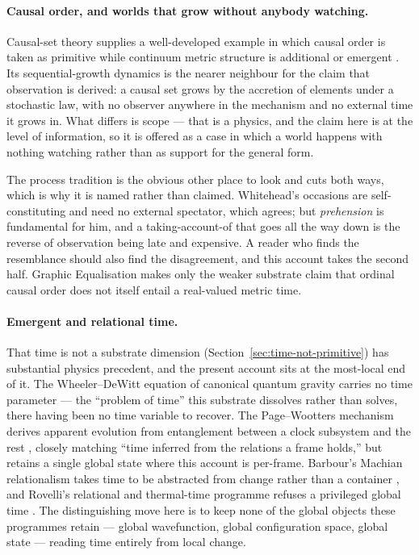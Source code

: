 \documentclass[11pt,a4paper]{article}
\theoremstyle{remark}\newtheorem{remark}[definition]{Remark}
\begin{document}
\paragraph{Causal order, and worlds that grow without anybody watching.} Causal-set theory supplies a
well-developed example in which causal order is taken as primitive while continuum metric structure is
additional or emergent \citep{bombelli1987}. Its sequential-growth dynamics \citep{rideout1999} is the
nearer neighbour for the claim that observation is derived: a causal set grows by the accretion of
elements under a stochastic law, with no observer anywhere in the mechanism and no external time it
grows in. What differs is scope --- that is a physics, and the claim here is at the level of
information, so it is offered as a case in which a world happens with nothing watching rather than as
support for the general form.

The process tradition is the obvious other place to look and cuts both ways, which is why it is named
rather than claimed. Whitehead's occasions are self-constituting and need no external spectator, which
agrees; but \emph{prehension} is fundamental for him, and a taking-account-of that goes all the way down
is the reverse of observation being late and expensive. A reader who finds the resemblance should also
find the disagreement, and this account takes the second half. Graphic Equalisation makes only the weaker substrate claim that ordinal causal order does not itself entail a real-valued metric time.

\paragraph{Emergent and relational time.} That time is not a substrate dimension (Section~\ref{sec:time-not-primitive}) has substantial physics precedent, and the present account sits at the most-local end of it. The Wheeler--DeWitt equation of canonical quantum gravity carries no time parameter \citep{dewitt1967} --- the ``problem of time'' this substrate dissolves rather than solves, there having been no time variable to recover. The Page--Wootters mechanism derives apparent evolution from entanglement between a clock subsystem and the rest \citep{pagewootters1983}, closely matching ``time inferred from the relations a frame holds,'' but retains a single global state where this account is per-frame. Barbour's Machian relationalism takes time to be abstracted from change rather than a container \citep{barbour1999}, and Rovelli's relational and thermal-time programme refuses a privileged global time \citep{rovelli1996,rovelli2011}. The distinguishing move here is to keep none of the global objects these programmes retain --- global wavefunction, global configuration space, global state --- reading time entirely from local change.
\end{document}
